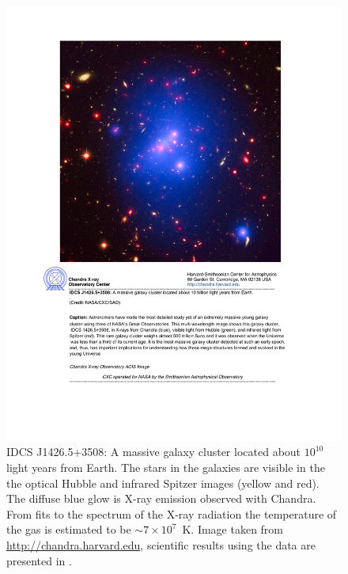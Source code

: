 \documentclass[12pt]{article}
\numberwithin{equation}{section}
\begin{document}
    \begin{figure}
    \centering
   \includegraphics[width=12cm]{figs/galaxy_cluster}
    \caption{IDCS J1426.5+3508: A massive galaxy cluster located about $10^{10}$ light years from Earth. The stars in the galaxies are visible in the the optical Hubble and infrared Spitzer images (yellow and red). The diffuse blue glow is X-ray emission observed with Chandra. From fits to the spectrum of the X-ray radiation the temperature of the gas is estimated to be $\sim 7\times 10^7$~K.
    Image taken from \url{http://chandra.harvard.edu}, scientific results using the data are presented in \citet{2016ApJ...817..122B}.}
     \label{fig:galaxy_cluster}
    \end{figure}
 
\end{document}
